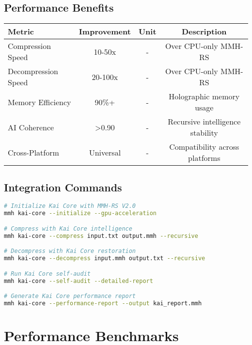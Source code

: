 \documentclass[12pt,a4paper]{article}
\begin{document}
\subsection{Performance Benefits}
\begin{center}
\begin{tabular}{|l|c|c|c|}
\hline
\textbf{Metric} & \textbf{Improvement} & \textbf{Unit} & \textbf{Description} \\
\hline
Compression Speed & 10-50x & - & Over CPU-only MMH-RS \\
Decompression Speed & 20-100x & - & Over CPU-only MMH-RS \\
Memory Efficiency & 90\%+ & - & Holographic memory usage \\
AI Coherence & >0.90 & - & Recursive intelligence stability \\
Cross-Platform & Universal & - & Compatibility across platforms \\
\hline
\end{tabular}
\end{center}

\subsection{Integration Commands}
\begin{lstlisting}[language=bash, caption=Kai Core Integration Commands]
# Initialize Kai Core with MMH-RS V2.0
mmh kai-core --initialize --gpu-acceleration

# Compress with Kai Core intelligence
mmh kai-core --compress input.txt output.mmh --recursive

# Decompress with Kai Core restoration
mmh kai-core --decompress input.mmh output.txt --recursive

# Run Kai Core self-audit
mmh kai-core --self-audit --detailed-report

# Generate Kai Core performance report
mmh kai-core --performance-report --output kai_report.mmh
\end{lstlisting}

\newpage

\section{Performance Benchmarks}
\end{document}
